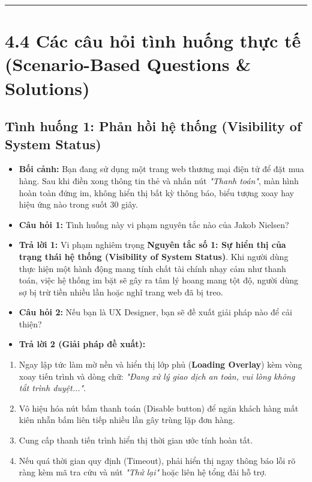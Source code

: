\documentclass[11pt,a4paper,oneside]{report}
\begin{document}
\bigskip\hrule\bigskip

\section{4.4 Các câu hỏi tình huống thực tế (Scenario-Based Questions \& Solutions)}

\subsection{Tình huống 1: Phản hồi hệ thống (Visibility of System Status)}
\begin{itemize}[leftmargin=1.5em]
\item \textbf{Bối cảnh:} Bạn đang sử dụng một trang web thương mại điện tử để đặt mua hàng. Sau khi điền xong thông tin thẻ và nhấn nút \textit{"Thanh toán"}, màn hình hoàn toàn đứng im, không hiển thị bất kỳ thông báo, biểu tượng xoay hay hiệu ứng nào trong suốt 30 giây.
\item \textbf{Câu hỏi 1:} Tình huống này vi phạm nguyên tắc nào của Jakob Nielsen?
\item \textbf{Trả lời 1:} Vi phạm nghiêm trọng \textbf{Nguyên tắc số 1: Sự hiển thị của trạng thái hệ thống (Visibility of System Status)}. Khi người dùng thực hiện một hành động mang tính chất tài chính nhạy cảm như thanh toán, việc hệ thống im bặt sẽ gây ra tâm lý hoang mang tột độ, người dùng sợ bị trừ tiền nhiều lần hoặc nghĩ trang web đã bị treo.
\item \textbf{Câu hỏi 2:} Nếu bạn là UX Designer, bạn sẽ đề xuất giải pháp nào để cải thiện?
\item \textbf{Trả lời 2 (Giải pháp đề xuất):}
\end{itemize}
\begin{enumerate}[leftmargin=1.5em]
\item Ngay lập tức làm mờ nền và hiển thị lớp phủ (\textbf{Loading Overlay}) kèm vòng xoay tiến trình và dòng chữ: \textit{"Đang xử lý giao dịch an toàn, vui lòng không tắt trình duyệt..."}.
\item Vô hiệu hóa nút bấm thanh toán (Disable button) để ngăn khách hàng mất kiên nhẫn bấm liên tiếp nhiều lần gây trùng lặp đơn hàng.
\item Cung cấp thanh tiến trình hiển thị thời gian ước tính hoàn tất.
\item Nếu quá thời gian quy định (Timeout), phải hiển thị ngay thông báo lỗi rõ ràng kèm mã tra cứu và nút \textit{"Thử lại"} hoặc liên hệ tổng đài hỗ trợ.
\end{enumerate}
\end{document}
